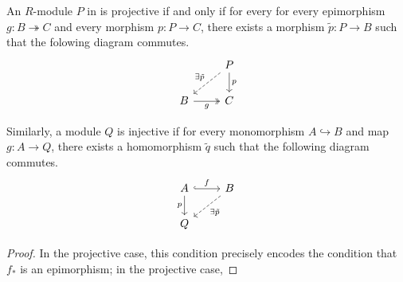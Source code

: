 \documentclass[main.tex]{subfiles}
\begin{document}
\begin{proposition}
  An $R$-module $P$ in is projective if and only if for every for every epimorphism $g\colon B \twoheadrightarrow C$ and every morphism $p\colon P \to C$, there exists a morphism $\tilde{p}\colon P \to B$ such that the folowing diagram commutes.
  \begin{equation*}
    \begin{tikzcd}
      & P
      \arrow[d, "p"]
      \arrow[dl, swap, dashed, "\exists\tilde{p}"]
      \\
      B
      \arrow[r, twoheadrightarrow, swap, "g"]
      & C
    \end{tikzcd}
  \end{equation*}

  Similarly, a module $Q$ is injective if for every monomorphism $A \hookrightarrow B$ and map $g\colon A \to Q$, there exists a homomorphism $\tilde{q}$ such that the following diagram commutes.
  \begin{equation*}
    \begin{tikzcd}
      A
      \arrow[r, hookrightarrow, "f"]
      \arrow[d, swap, "p"]
      & B
      \arrow[dl, dashed, "\exists\tilde{p}"]
      \\
      Q
    \end{tikzcd}
  \end{equation*}

\end{proposition}
\begin{proof}
  In the projective case, this condition precisely encodes the condition that $f_{*}$ is an epimorphism; in the projective case, 
\end{proof}
\end{document}

